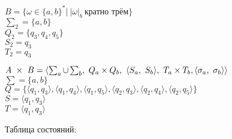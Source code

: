 \documentclass{article}
\begin{document}
\begin{enumerate}
            \begin{center}
            \end{center}

            \(B = \{ \omega \in \{a,b\}^*| \ |\omega|_b \  \text{кратно трём} \}\) \\
        
            \hspace*{-20mm}\(\sum_2 = \{ a,b \}\) \\
            \hspace*{-20mm}\(Q_2 = \{ q_3, q_4, q_5 \}\) \\
            \hspace*{-20mm}\(S_2 = q_3\) \\
            \hspace*{-20mm}\(T_2 = q_3\) \\
            
            \begin{center}
            \end{center}
            
            \(A\ \times\  B = \langle{\sum_a\cup\sum_b,\ Q_a\times Q_b,\ \langle S_a,\ S_b\rangle,\ T_a\times T_b,\ \\
            \langle \sigma_a,\ \sigma_b\rangle }\rangle\)\\
            \hspace*{-20mm}\(\sum = \{ a,b \}\) \\
            \hspace*{-20mm}\(Q = \{\langle q_1, q_3\rangle, \langle q_1, q_4\rangle, \langle q_1, q_5\rangle, \langle q_2, q_3\rangle, \langle q_2, q_4\rangle, \langle q_2, q_5\rangle\}\) \\
            \hspace*{-20mm}\(S = \langle q_1, q_3\rangle\) \\
            \hspace*{-20mm}\(T = \langle q_1, q_3\rangle\) \\
        
            \centerline{Таблица состояний:}
            

\end{enumerate}
\end{document}
